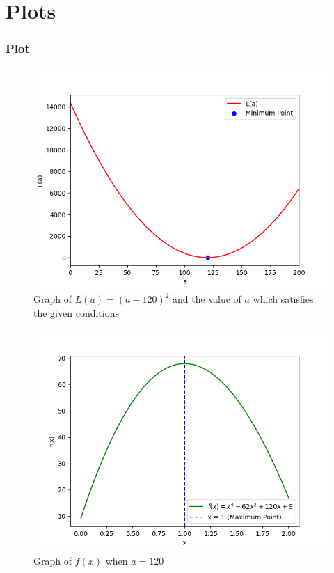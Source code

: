 \documentclass{beamer}
\providecommand{\brak}[1]{\ensuremath{\left(#1\right)}}
\theoremstyle{remark}
\numberwithin{equation}{section}
\begin{document}
\section{Plots}
\begin{frame}
\frametitle{Plot}
\begin{figure}[h!]
   \centering
   \includegraphics[width=0.8\columnwidth]{figs/fig1.png}
   \caption{Graph of $L\brak{a} = \brak{a - 120}^2$ and the value of $a$ which satisfies the given conditions}
   \label{stemplot}
\end{figure}
\end{frame}
\begin{frame}
\begin{figure}[h!]
   \centering
   \includegraphics[width=0.8\columnwidth]{figs/fig2.png}
   \caption{Graph of $f\brak{x}$ when $a = 120$}
   \label{stemplot}
\end{figure}
\end{frame}
\end{document}
